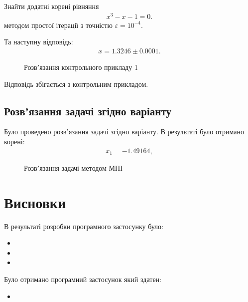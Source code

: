 \documentclass[../../../../document]{subfiles}
\begin{document}
	Знайти додатні корені рівняння 
	\begin{gather}
		x^3-x-1=0.
	\end{gather}
	методом простої ітерації з точністю \(\varepsilon = 10^{-4}\). 

	Та наступну відповідь:
	\begin{gather}
		x = 1.3246\pm0.0001. 
	\end{gather}

	\begin{figure}[!h]
		\begin{center}
		\end{center}
		\caption{Розвʼязання контрольного прикладу 1}\label{fig:test01}
	\end{figure}
	Відповідь збігається з контрольним прикладом.

	\section{Розвʼязання задачі згідно варіанту}
	Було проведено розвʼязання задачі згідно варіанту. В результаті було отримано корені:
	\begin{gather}
		x_1=-1.49164,
	\end{gather}
	\begin{figure}[!h]
		\begin{center}
		\end{center}
		\caption{Розвʼязання задачі методом МПІ}\label{fig:test1}
	\end{figure}

	\FloatBarrier
	\newpage
	\chapter{Висновки}
	В результаті розробки програмного застосунку було:
	\begin{itemize}
		\item
		\item
		\item
	\end{itemize}
	Було отримано програмний застосунок який здатен:
	\begin{itemize}
		\item 
	\end{itemize}
\end{document}
